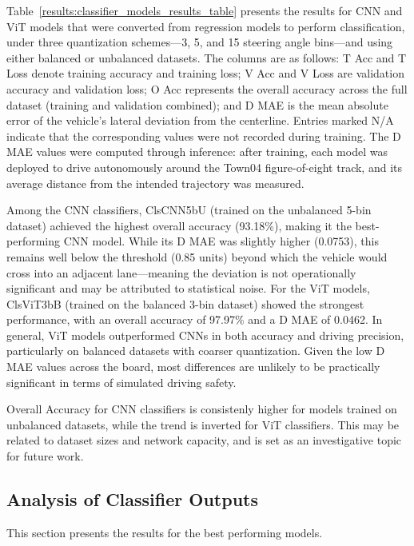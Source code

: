 Table~\ref{results:classifier_models_results_table} presents the results for CNN and ViT models that were converted from regression models to perform classification, under three quantization schemes—3, 5, and 15 steering angle bins—and using either balanced or unbalanced datasets. The columns are as follows: T Acc and T Loss denote training accuracy and training loss; V Acc and V Loss are validation accuracy and validation loss; O Acc represents the overall accuracy across the full dataset (training and validation combined); and D MAE is the mean absolute error of the vehicle’s lateral deviation from the centerline. Entries marked N/A indicate that the corresponding values were not recorded during training. The D MAE values were computed through inference: after training, each model was deployed to drive autonomously around the Town04 figure-of-eight track, and its average distance from the intended trajectory was measured.

Among the CNN classifiers, ClsCNN5bU (trained on the unbalanced 5-bin dataset) achieved the highest overall accuracy (93.18\%), making it the best-performing CNN model. While its D MAE was slightly higher (0.0753), this remains well below the threshold (0.85 units) beyond which the vehicle would cross into an adjacent lane—meaning the deviation is not operationally significant and may be attributed to statistical noise. For the ViT models, ClsViT3bB (trained on the balanced 3-bin dataset) showed the strongest performance, with an overall accuracy of 97.97\% and a D MAE of 0.0462. In general, ViT models outperformed CNNs in both accuracy and driving precision, particularly on balanced datasets with coarser quantization. Given the low D MAE values across the board, most differences are unlikely to be practically significant in terms of simulated driving safety.

Overall Accuracy for CNN classifiers is consistenly higher for models trained on unbalanced datasets, while the trend is inverted for ViT classifiers. This may be related to dataset sizes and network capacity, and is set as an investigative topic for future work.

\subsection{Analysis of Classifier Outputs}

This section presents the results for the best performing models.


